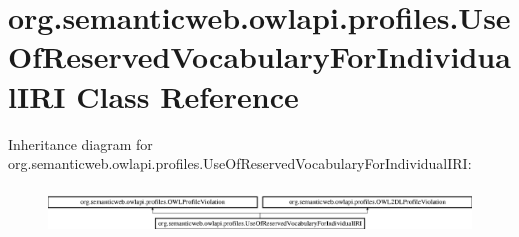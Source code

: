 \hypertarget{classorg_1_1semanticweb_1_1owlapi_1_1profiles_1_1_use_of_reserved_vocabulary_for_individual_i_r_i}{\section{org.\-semanticweb.\-owlapi.\-profiles.\-Use\-Of\-Reserved\-Vocabulary\-For\-Individual\-I\-R\-I Class Reference}
\label{classorg_1_1semanticweb_1_1owlapi_1_1profiles_1_1_use_of_reserved_vocabulary_for_individual_i_r_i}
}
Inheritance diagram for org.\-semanticweb.\-owlapi.\-profiles.\-Use\-Of\-Reserved\-Vocabulary\-For\-Individual\-I\-R\-I\-:\begin{figure}[H]
\begin{center}
\leavevmode
\includegraphics[height=1.250000cm]{classorg_1_1semanticweb_1_1owlapi_1_1profiles_1_1_use_of_reserved_vocabulary_for_individual_i_r_i}
\end{center}
\end{figure}
